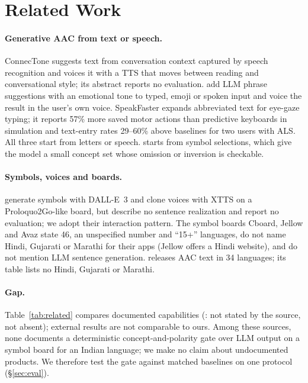 \section{Related Work}
\label{sec:related}

\paragraph{Generative AAC from text or speech.}
ConnecTone \citep{francis2024connectone} suggests text from conversation context captured by speech recognition and voices it with a TTS that moves between reading and conversational style; its abstract reports no evaluation.
\citet{mohan2024composition} add LLM phrase suggestions with an emotional tone to typed, emoji or spoken input and voice the result in the user's own voice.
SpeakFaster \citep{cai2024speakfaster} expands abbreviated text for eye-gaze typing; it reports 57\% more saved motor actions than predictive keyboards in simulation and text-entry rates 29--60\% above baselines for two users with ALS.
All three start from letters or speech. \sys{} starts from symbol selections, which give the model a small concept set whose omission or inversion is checkable.

\paragraph{Symbols, voices and boards.}
\citet{francis2025static} generate symbols with DALL-E~3 and clone voices with XTTS on a Proloquo2Go-like board, but describe no sentence realization and report no evaluation; we adopt their interaction pattern.
The symbol boards Cboard, Jellow and Avaz \citep{cboard,jellow,avaz} state 46, an unspecified number and ``15+'' languages, do not name Hindi, Gujarati or Marathi for their apps (Jellow offers a Hindi website), and do not mention LLM sentence generation.
\citet{vertanen2026multilingual} releases AAC text in 34 languages; its table lists no Hindi, Gujarati or Marathi.

\paragraph{Gap.}
Table~\ref{tab:related} compares documented capabilities (\nstated{}: not stated by the source, not absent); external results are not comparable to ours.
Among these sources, none documents a deterministic concept-and-polarity gate over LLM output on a symbol board for an Indian language; we make no claim about undocumented products.
We therefore test the gate against matched baselines on one protocol (\S\ref{sec:eval}).

